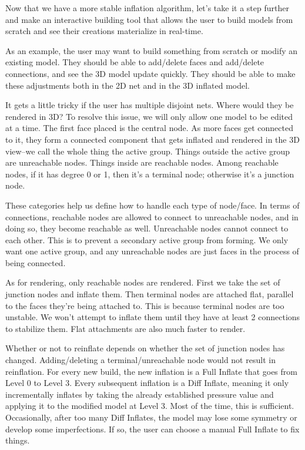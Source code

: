 \documentclass[letterpaper,11pt]{article}
\begin{document}
Now that we have a more stable inflation algorithm, let's take it a step further and make an interactive building tool that allows the user to build models from scratch and see their creations materialize in real-time.

As an example, the user may want to build something from scratch or modify an existing model. They should be able to add/delete faces and add/delete connections, and see the 3D model update quickly. They should be able to make these adjustments both in the 2D net and in the 3D inflated model.

It gets a little tricky if the user has multiple disjoint nets. Where would they be rendered in 3D? To resolve this issue, we will only allow one model to be edited at a time. The first face placed is the central node. As more faces get connected to it, they form a connected component that gets inflated and rendered in the 3D view--we call the whole thing the active group. Things outside the active group are unreachable nodes. Things inside are reachable nodes. Among reachable nodes, if it has degree 0 or 1, then it's a terminal node; otherwise it's a junction node.

These categories help us define how to handle each type of node/face. In terms of connections, reachable nodes are allowed to connect to unreachable nodes, and in doing so, they become reachable as well. Unreachable nodes cannot connect to each other. This is to prevent a secondary active group from forming. We only want one active group, and any unreachable nodes are just faces in the process of being connected.

As for rendering, only reachable nodes are rendered. First we take the set of junction nodes and inflate them. Then terminal nodes are attached flat, parallel to the faces they're being attached to. This is because terminal nodes are too unstable. We won't attempt to inflate them until they have at least 2 connections to stabilize them. Flat attachments are also much faster to render.

Whether or not to reinflate depends on whether the set of junction nodes has changed. Adding/deleting a terminal/unreachable node would not result in reinflation. For every new build, the new inflation is a Full Inflate that goes from Level 0 to Level 3. Every subsequent inflation is a Diff Inflate, meaning it only incrementally inflates by taking the already established pressure value and applying it to the modified model at Level 3. Most of the time, this is sufficient. Occasionally, after too many Diff Inflates, the model may lose some symmetry or develop some imperfections. If so, the user can choose a manual Full Inflate to fix things.
\end{document}
